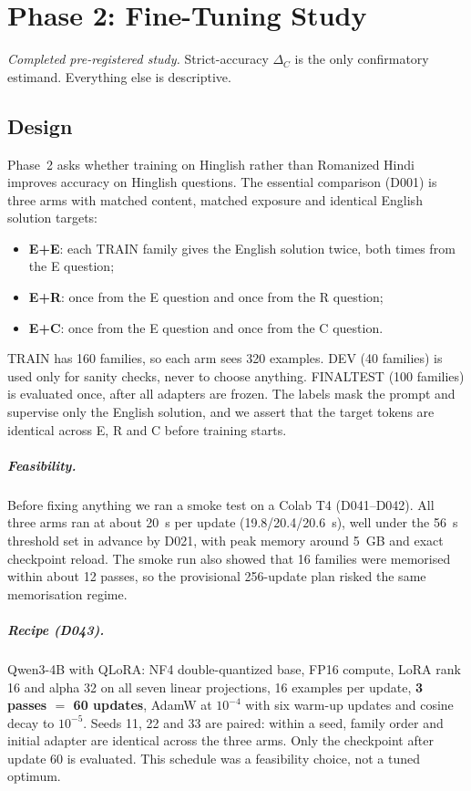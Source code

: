 \documentclass[12pt,a4paper,oneside]{report}
\renewcommand{\_}{\oldunderscore\allowbreak}
\begin{document}
\chapter{Phase 2: Fine-Tuning Study}
\label{ch:phase2}

\noindent\textit{Completed pre-registered study.} Strict-accuracy $\Delta_C$ is the only confirmatory estimand. Everything else is descriptive.

\section{Design}

Phase~2 asks whether training on Hinglish rather than Romanized Hindi improves accuracy on Hinglish questions. The essential comparison (D001) is three arms with matched content, matched exposure and identical English solution targets:
\begin{itemize}
\item \textbf{E+E}: each TRAIN family gives the English solution twice, both times from the E question;
\item \textbf{E+R}: once from the E question and once from the R question;
\item \textbf{E+C}: once from the E question and once from the C question.
\end{itemize}
TRAIN has 160 families, so each arm sees 320 examples. DEV (40 families) is used only for sanity checks, never to choose anything. FINAL\_TEST (100 families) is evaluated once, after all adapters are frozen. The labels mask the prompt and supervise only the English solution, and we assert that the target tokens are identical across E, R and C before training starts.

\paragraph{Feasibility.} Before fixing anything we ran a smoke test on a Colab T4 (D041--D042). All three arms ran at about 20~s per update (19.8/20.4/20.6~s), well under the 56~s threshold set in advance by D021, with peak memory around 5~GB and exact checkpoint reload. The smoke run also showed that 16 families were memorised within about 12 passes, so the provisional 256-update plan risked the same memorisation regime.

\paragraph{Recipe (D043).} Qwen3-4B with QLoRA: NF4 double-quantized base, FP16 compute, LoRA rank 16 and alpha 32 on all seven linear projections, 16 examples per update, \textbf{3 passes $=$ 60 updates}, AdamW at $10^{-4}$ with six warm-up updates and cosine decay to $10^{-5}$. Seeds 11, 22 and 33 are paired: within a seed, family order and initial adapter are identical across the three arms. Only the checkpoint after update 60 is evaluated. This schedule was a feasibility choice, not a tuned optimum.
\end{document}
